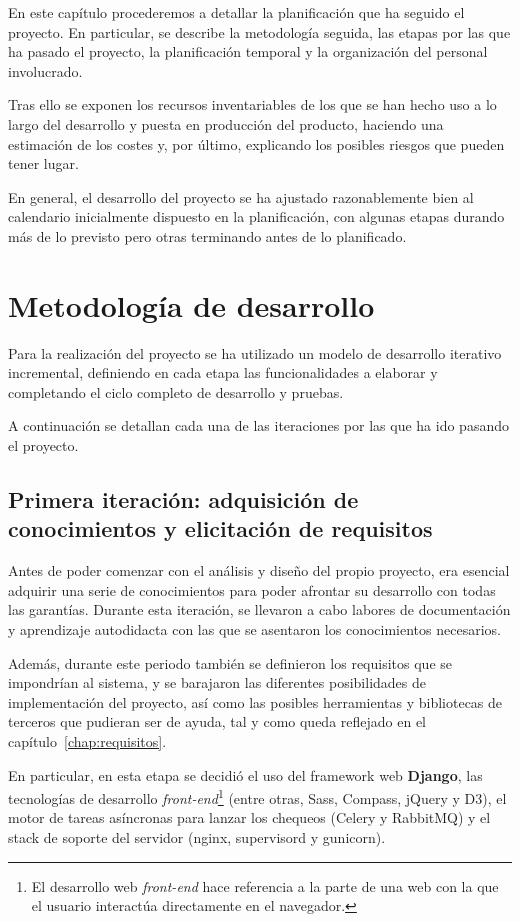 En este capítulo procederemos a detallar la planificación que ha seguido el
proyecto. En particular, se describe la metodología seguida, las etapas por las
que ha pasado el proyecto, la planificación temporal y la organización del
personal involucrado. 

Tras ello se exponen los recursos inventariables de los
que se han hecho uso a lo largo del desarrollo y puesta en producción del
producto, haciendo una estimación de los costes y, por último, explicando los
posibles riesgos que pueden tener lugar.

En general, el desarrollo del proyecto se ha ajustado razonablemente bien al calendario
inicialmente dispuesto en la planificación, con algunas etapas durando más de lo
previsto pero otras terminando antes de lo planificado. 

\section{Metodología de desarrollo}

Para la realización del proyecto se ha utilizado un modelo de desarrollo
iterativo incremental, definiendo en cada etapa las funcionalidades a
elaborar y completando el ciclo completo de desarrollo y pruebas. 

A continuación se detallan cada una de las iteraciones por las que ha ido
pasando el proyecto.

\subsection{Primera iteración: adquisición de conocimientos y elicitación de requisitos}

Antes de poder comenzar con el análisis y diseño del propio proyecto,
era esencial adquirir una serie de conocimientos para poder afrontar
su desarrollo con todas las garantías. Durante esta iteración, se
llevaron a cabo labores de documentación y aprendizaje autodidacta con
las que se asentaron los conocimientos necesarios.

Además, durante este periodo también se definieron los requisitos que se
impondrían al sistema, y se barajaron las diferentes posibilidades de
implementación del proyecto, así como las posibles herramientas y bibliotecas de
terceros que pudieran ser de ayuda, tal y como queda reflejado en el capítulo~\ref{chap:requisitos}.

En particular, en esta etapa se decidió el uso del framework web
\textbf{Django}, las tecnologías de desarrollo \textit{front-end}\footnote{El
  desarrollo web \textit{front-end} hace referencia a la parte de una web con la
  que el usuario interactúa directamente en el navegador.} (entre otras, Sass,
Compass, jQuery y D3), el motor de tareas asíncronas para lanzar los chequeos
(Celery y RabbitMQ) y el stack de soporte del servidor (nginx, supervisord y
gunicorn).

